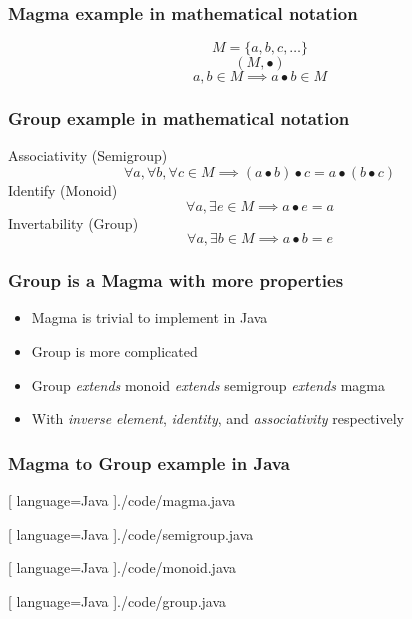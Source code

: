 \begin{frame}
  \frametitle{Magma example in mathematical notation}
  \begin{equation}
    M = \{ a, b, c, \dots \}
  \end{equation}
  \begin{equation}
    (M, \bullet)
  \end{equation}
  \begin{equation}
    a, b \in M \implies a \bullet b \in M
  \end{equation}
\end{frame}

\begin{frame}
  \frametitle{Group example in mathematical notation}
  Associativity (Semigroup)
  \begin{equation}
    \forall a, \forall b, \forall c \in M \implies
    (a \bullet b) \bullet c = a \bullet (b \bullet c)
  \end{equation}
  Identify (Monoid)
  \begin{equation}
    \forall a, \exists e \in M \implies a \bullet e = a
  \end{equation}
  Invertability (Group)
  \begin{equation}
    \forall a, \exists b \in M \implies a \bullet b = e
  \end{equation}
\end{frame}

\begin{frame}
  \frametitle{Group is a Magma with more properties}
  \begin{itemize}
    \item Magma is trivial to implement in Java
    \item Group is more complicated
    \item Group \textit{extends} monoid \textit{extends} semigroup
      \textit{extends} magma
    \item With \textit{inverse element}, \textit{identity}, and
      \textit{associativity} respectively
  \end{itemize}
\end{frame}

\begin{frame}
  \frametitle{Magma to Group example in Java}
  \begin{center}
    
    [ language=Java
    ]{./code/magma.java}
  \end{center}
  \begin{center}
    
    [ language=Java
    ]{./code/semigroup.java}
  \end{center}
  \begin{center}
    
    [ language=Java
    ]{./code/monoid.java}
  \end{center}
  \begin{center}
    
    [ language=Java
    ]{./code/group.java}
  \end{center}
\end{frame}

